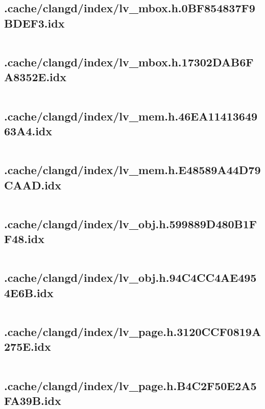 \subsection{.cache/clangd/index/lv_mbox.h.0BF854837F9BDEF3.idx}
\inputminted[linenos,tabsize=2,breaklines, breakanywhere]{c}{lv_mbox.h.0BF854837F9BDEF3.idx}
\pagebreak

\subsection{.cache/clangd/index/lv_mbox.h.17302DAB6FA8352E.idx}
\inputminted[linenos,tabsize=2,breaklines, breakanywhere]{c}{lv_mbox.h.17302DAB6FA8352E.idx}
\pagebreak

\subsection{.cache/clangd/index/lv_mem.h.46EA1141364963A4.idx}
\inputminted[linenos,tabsize=2,breaklines, breakanywhere]{c}{lv_mem.h.46EA1141364963A4.idx}
\pagebreak

\subsection{.cache/clangd/index/lv_mem.h.E48589A44D79CAAD.idx}
\inputminted[linenos,tabsize=2,breaklines, breakanywhere]{c}{lv_mem.h.E48589A44D79CAAD.idx}
\pagebreak

\subsection{.cache/clangd/index/lv_obj.h.599889D480B1FF48.idx}
\inputminted[linenos,tabsize=2,breaklines, breakanywhere]{c}{lv_obj.h.599889D480B1FF48.idx}
\pagebreak

\subsection{.cache/clangd/index/lv_obj.h.94C4CC4AE4954E6B.idx}
\inputminted[linenos,tabsize=2,breaklines, breakanywhere]{c}{lv_obj.h.94C4CC4AE4954E6B.idx}
\pagebreak

\subsection{.cache/clangd/index/lv_page.h.3120CCF0819A275E.idx}
\inputminted[linenos,tabsize=2,breaklines, breakanywhere]{c}{lv_page.h.3120CCF0819A275E.idx}
\pagebreak

\subsection{.cache/clangd/index/lv_page.h.B4C2F50E2A5FA39B.idx}
\inputminted[linenos,tabsize=2,breaklines, breakanywhere]{c}{lv_page.h.B4C2F50E2A5FA39B.idx}
\pagebreak

